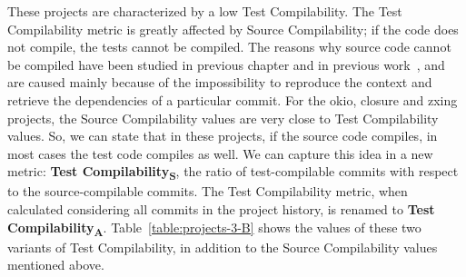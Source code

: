 These projects are characterized by a low Test Compilability. 
The Test Compilability metric is greatly affected by Source Compilability; if the code does not compile, the tests cannot be compiled. 
The reasons why source code cannot be compiled have been studied in previous chapter and in previous work~\cite{tufano2017there,Sulir:2016:QSJ:3001878.3001882}, and are caused mainly because of the impossibility to reproduce the context and retrieve the dependencies of a particular commit. 
For the okio, closure and zxing projects, the Source Compilability values are very close to Test Compilability values.
So, we can state that in these projects, if the source code compiles, in most cases the test code compiles as well. 
We can capture this idea in a new metric: \textbf{Test Compilability\textsubscript{S}}, the ratio of test-compilable commits with respect to the source-compilable commits.
The Test Compilability metric, when calculated considering all commits in the project history, is renamed to \textbf{Test Compilability\textsubscript{A}}.
Table~\ref{table:projects-3-B} shows the values of these two variants of Test Compilability, in addition to the Source Compilability values mentioned above.


